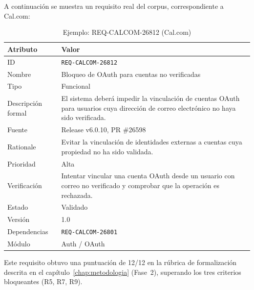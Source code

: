 A continuaci\'on se muestra un requisito real del corpus, correspondiente a Cal.com:

\begin{table}[h]
\centering
\caption{Ejemplo: REQ-CALCOM-26812 (Cal.com)}
\label{tab:ejemplo-req}
\begin{tabular}{lp{10cm}}
\toprule
\textbf{Atributo} & \textbf{Valor} \\
\midrule
ID & \texttt{REQ-CALCOM-26812} \\
Nombre & Bloqueo de OAuth para cuentas no verificadas \\
Tipo & Funcional \\
Descripci\'on formal & El sistema deber\'a impedir la vinculaci\'on de cuentas OAuth para usuarios cuya direcci\'on de correo electr\'onico no haya sido verificada. \\
Fuente & Release v6.0.10, PR \#26598 \\
Rationale & Evitar la vinculaci\'on de identidades externas a cuentas cuya propiedad no ha sido validada. \\
Prioridad & Alta \\
Verificaci\'on & Intentar vincular una cuenta OAuth desde un usuario con correo no verificado y comprobar que la operaci\'on es rechazada. \\
Estado & Validado \\
Versi\'on & 1.0 \\
Dependencias & \texttt{REQ-CALCOM-26801} \\
M\'odulo & Auth / OAuth \\
\bottomrule
\end{tabular}
\end{table}

Este requisito obtuvo una puntuaci\'on de 12/12 en la r\'ubrica de formalizaci\'on descrita en el cap\'itulo~\ref{chap:metodologia} (Fase~2), superando los tres criterios bloqueantes (R5, R7, R9).
